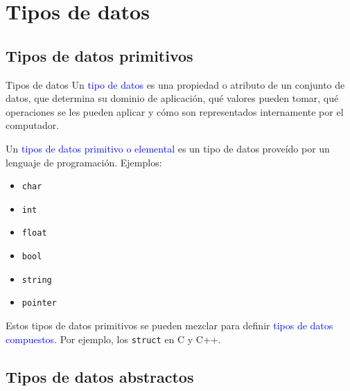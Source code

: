 \documentclass{beamer} %
\newcommand{\blue}[1]{\textcolor{blue}{#1}}
\begin{document}

\section{Tipos de datos}

\subsection{Tipos de datos primitivos}

\begin{frame}{Tipos de datos}
    Un \blue{tipo de datos} es una propiedad o atributo de un conjunto de datos, que determina su dominio de aplicación, qué valores pueden tomar, qué operaciones se les pueden aplicar y cómo son representados internamente por el computador.
    \medskip\pause 

    Un \blue{tipos de datos primitivo o elemental} es un tipo de datos proveído por un lenguaje de programación. Ejemplos:
    \pause
    
      \begin{multicols}{2}
      \begin{itemize}
        \item<3-> \texttt{char}
        \item<3-> \texttt{int}
        \item<3-> \texttt{float}
        \item<3-> \texttt{bool}
        \item<3-> \texttt{string}
        \item<3-> \texttt{pointer}
      \end{itemize}
      \end{multicols}
    \pause
    Estos tipos de datos primitivos se pueden mezclar para definir \blue{tipos de datos compuestos}. Por ejemplo, los \texttt{struct} en C y C++.
\end{frame}

\subsection{Tipos de datos abstractos}
\end{document}
